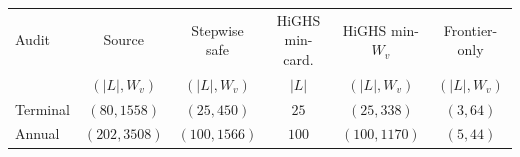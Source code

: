 \begin{tabular}{@{}lccccc@{}}
\toprule
Audit & Source & Stepwise safe & HiGHS min-card. & HiGHS min-\(W_v\) & Frontier-only \\
 & \((|L|,W_v)\) & \((|L|,W_v)\) & \(|L|\) & \((|L|,W_v)\) & \((|L|,W_v)\) \\
\midrule
Terminal & \((80,1558)\) & \((25,450)\) & \(25\) & \((25,338)\) & \((3,64)\) \\
Annual & \((202,3508)\) & \((100,1566)\) & \(100\) & \((100,1170)\) & \((5,44)\) \\
\bottomrule
\end{tabular}
